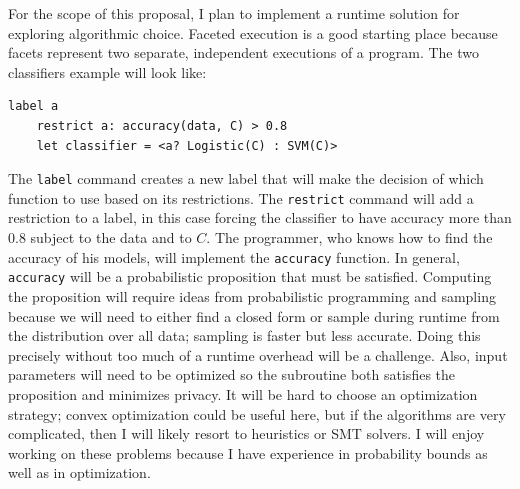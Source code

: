 \documentclass[10.5pt]{article}
\begin{document}
For the scope of this proposal, I plan to implement a runtime solution for exploring algorithmic choice. Faceted execution \cite{Austin:2013} is a good starting place because facets represent two separate, independent executions of a program. The two classifiers example will look like:
\begin{verbatim}
label a
    restrict a: accuracy(data, C) > 0.8
    let classifier = <a? Logistic(C) : SVM(C)>
\end{verbatim}

The \verb|label| command creates a new label that will make the decision of which function to use based on its restrictions. The \verb|restrict| command will add a restriction to a label, in this case forcing the classifier to have accuracy more than 0.8 subject to the data and to $C$. The programmer, who knows how to find the accuracy of his models, will implement the \verb|accuracy| function. In general, \verb|accuracy| will be a probabilistic proposition that must be satisfied. Computing the proposition will require ideas from probabilistic programming and sampling \cite{Sampson:2014} \cite{Kucera:2017} because we will need to either find a closed form or sample during runtime from the distribution over all data; sampling is faster but less accurate. Doing this precisely without too much of a runtime overhead will be a challenge. Also, input parameters will need to be optimized so the subroutine both satisfies the proposition and minimizes privacy. It will be hard to choose an optimization strategy; convex optimization could be useful here, but if the algorithms are very complicated, then I will likely resort to heuristics or SMT solvers. I will enjoy working on these problems because I have experience in probability bounds as well as in optimization. 
\end{document}
